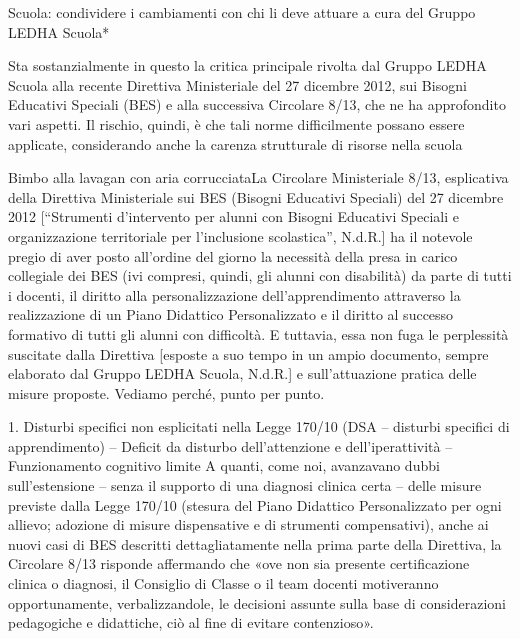 Scuola: condividere i cambiamenti con chi li deve attuare
a cura del Gruppo LEDHA Scuola*	

Sta sostanzialmente in questo la critica principale rivolta dal Gruppo LEDHA Scuola alla recente Direttiva Ministeriale del 27 dicembre 2012, sui Bisogni Educativi Speciali (BES) e alla successiva Circolare 8/13, che ne ha approfondito vari aspetti. Il rischio, quindi, è che tali norme difficilmente possano essere applicate, considerando anche la carenza strutturale di risorse nella scuola

Bimbo alla lavagan con aria corrucciataLa Circolare Ministeriale 8/13, esplicativa della Direttiva Ministeriale sui BES (Bisogni Educativi Speciali) del 27 dicembre 2012 [“Strumenti d’intervento per alunni con Bisogni Educativi Speciali e organizzazione territoriale per l’inclusione scolastica”, N.d.R.] ha il notevole pregio di aver posto all’ordine del giorno la necessità della presa in carico collegiale dei BES (ivi compresi, quindi, gli alunni con disabilità) da parte di tutti i docenti, il diritto alla personalizzazione dell’apprendimento attraverso la realizzazione di un Piano Didattico Personalizzato e il diritto al successo formativo di tutti gli alunni con difficoltà. E tuttavia, essa non fuga le perplessità suscitate dalla Direttiva [esposte a suo tempo in un ampio documento, sempre elaborato dal Gruppo LEDHA Scuola, N.d.R.] e sull’attuazione pratica delle misure proposte. Vediamo perché, punto per punto.

1. Disturbi specifici non esplicitati nella Legge 170/10 (DSA – disturbi specifici di apprendimento) – Deficit da disturbo dell’attenzione e dell’iperattività – Funzionamento cognitivo limite
A quanti, come noi, avanzavano dubbi sull’estensione – senza il supporto di una diagnosi clinica certa – delle misure previste dalla Legge 170/10 (stesura del Piano Didattico Personalizzato per ogni allievo; adozione di misure dispensative e di strumenti compensativi), anche ai nuovi casi di BES descritti dettagliatamente nella prima parte della Direttiva, la Circolare 8/13 risponde affermando che «ove non sia presente certificazione clinica o diagnosi, il Consiglio di Classe o il team docenti motiveranno opportunamente, verbalizzandole, le decisioni assunte sulla base di considerazioni pedagogiche e didattiche, ciò al fine di evitare contenzioso».

